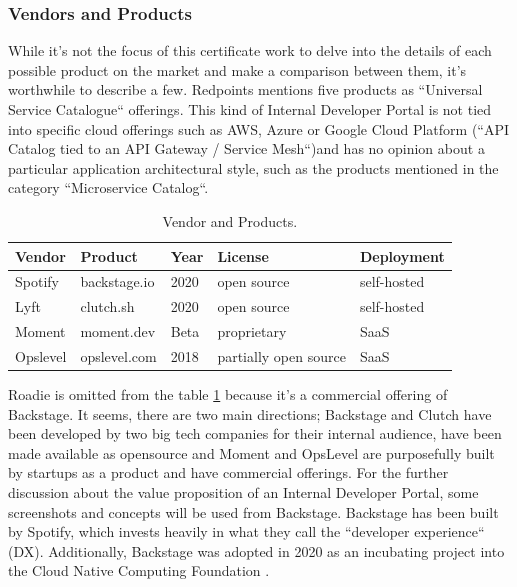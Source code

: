 \documentclass[a4paper,12pt]{article}
\begin{document}
    \subsubsection{Vendors and Products}
    \label{sssec:vendors}
    While it's not the focus of this certificate work to delve into the details of each possible product on the market
    and make a comparison between them, it's worthwhile to describe a few.
    Redpoints mentions five products as ``Universal Service Catalogue`` offerings\parencite{devportalsprimer}.
    This kind of Internal Developer Portal is not tied into specific cloud offerings such as AWS, Azure or Google
    Cloud Platform (``API Catalog tied to an API Gateway / Service Mesh``)and has no opinion about a particular application
    architectural style, such as the products mentioned in the category ``Microservice Catalog``.
    \begin{table}[!htbp]
        \begin{center}
            \begin{tabularx}{\textwidth}{lllll}
                \toprule
                Vendor   & Product      & Year & License               & Deployment  \\
                \midrule
                Spotify  & backstage.io & 2020 & open source           & self-hosted \\
                Lyft     & clutch.sh    & 2020 & open source           & self-hosted \\
                Moment   & moment.dev   & Beta & proprietary           & SaaS        \\
                Opslevel & opslevel.com & 2018 & partially open source & SaaS        \\
                \bottomrule
            \end{tabularx}
            \caption{\label{tab:vendors} Vendor and Products.}
        \end{center}
    \end{table}
    Roadie is omitted from the table \ref{tab:vendors} because it's a commercial offering of Backstage.
    It seems, there are two main directions; Backstage and Clutch have been developed by two big tech companies for their
    internal audience, have been made available as opensource and Moment
    and OpsLevel are purposefully built by startups as a product and have commercial offerings.
    For the further discussion about the value proposition of an Internal Developer Portal, some screenshots and concepts will
    be used from Backstage.
    Backstage has been built by Spotify, which invests heavily in what they call the
    ``developer experience`` (DX)\parencite{spotifydx}.
    Additionally, Backstage was adopted in 2020 as an incubating project into the Cloud Native Computing Foundation\parencite{cncf} .
\end{document}
